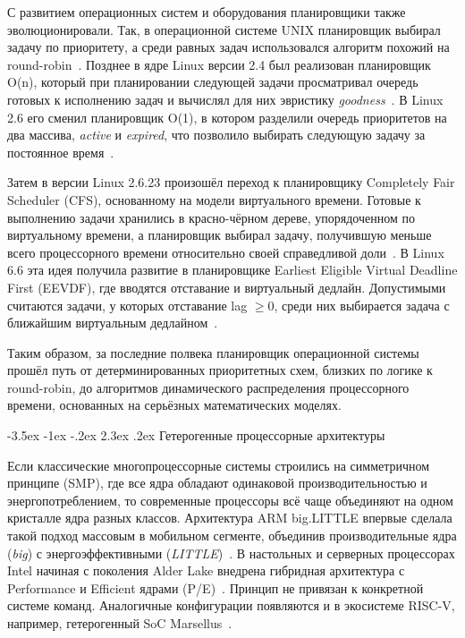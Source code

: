 \documentclass[14pt, oneside]{extbook}
\makeatletter
\renewcommand\section{\@startsection {section}{1}{\z@}%
                                   {-3.5ex \@plus -1ex \@minus -.2ex}%
                                   {2.3ex \@plus.2ex}%
                                   {\normalfont\fontsize{16}{20}\selectfont\bfseries}}
\makeatother
\begin{document}
        С развитием операционных систем и оборудования планировщики также
        эволюционировали.
        Так, в операционной системе UNIX планировщик выбирал задачу
        по приоритету,
        а среди равных задач использовался алгоритм похожий на
        round-robin~\cite{lions}.
        Позднее в ядре Linux версии 2.4 был реализован планировщик
        O(n), который при планировании
        следующей задачи просматривал очередь готовых к исполнению задач
        и вычислял для них эвристику \textit{goodness}~\cite{kravetz_elss}.
        В Linux 2.6 его сменил планировщик O(1), в котором разделили
        очередь приоритетов на два массива, \textit{active} и
        \textit{expired}, что позволило выбирать
        следующую задачу за постоянное время~\cite{love}.

        Затем в версии Linux 2.6.23 произошёл переход к планировщику
        Completely Fair Scheduler (CFS), основанному на модели виртуального
        времени. Готовые к выполнению задачи хранились в красно-чёрном дереве,
        упорядоченном по виртуальному времени, а планировщик выбирал задачу,
        получившую меньше всего процессорного времени относительно своей
        справедливой доли~\cite{wong}.
        В Linux 6.6 эта идея получила развитие в планировщике Earliest
        Eligible Virtual Deadline First (EEVDF), где вводятся
        отставание и виртуальный дедлайн. Допустимыми считаются задачи,
        у которых отставание lag $ \geq 0 $, среди них выбирается задача с
        ближайшим виртуальным дедлайном~\cite{stoica}.

        Таким образом, за последние полвека планировщик операционной
        системы прошёл путь от детерминированных приоритетных схем,
        близких по логике к round-robin, до алгоритмов динамического
        распределения процессорного времени, основанных на серьёзных
        математических моделях.


\section{Гетерогенные процессорные архитектуры}

        Если классические многопроцессорные системы строились на
        симметричном принципе (SMP), где все ядра обладают
        одинаковой производительностью и энергопотреблением,
        то современные процессоры всё чаще объединяют на одном
        кристалле ядра разных классов. Архитектура ARM big.LITTLE
        впервые сделала такой подход массовым в мобильном
        сегменте, объединив производительные ядра (\textit{big})
        с энергоэффективными (\textit{LITTLE})~\cite{biglittle}.
        В настольных и серверных процессорах Intel начиная с
        поколения Alder Lake внедрена гибридная архитектура с
        Performance и Efficient ядрами (P/E)~\cite{intelhybrid}.
        Принцип не привязан к конкретной системе команд.
        Аналогичные конфигурации появляются и в экосистеме
        RISC-V, например, гетерогенный SoC Marsellus~\cite{marsellus}.
\end{document}
